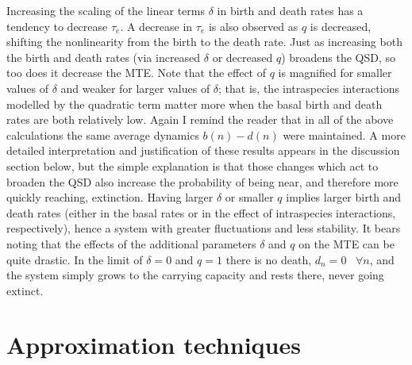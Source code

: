 Increasing the scaling of the linear terms $\delta$ in birth and death rates has a tendency to decrease $\tau_e$. 
A decrease in $\tau_e$ is also observed as $q$ is decreased, shifting the nonlinearity from the birth to the death rate. 
Just as increasing both the birth and death rates (via increased $\delta$ or decreased $q$) broadens the QSD, so too does it decrease the MTE. 
Note that the effect of $q$ is magnified for smaller values of $\delta$ and weaker for larger values of $\delta$; that is, the intraspecies interactions modelled by the quadratic term matter more when the basal birth and death rates are both relatively low. 
Again I remind the reader that in all of the above calculations the same average dynamics $b(n)-d(n)$ were maintained. 
A more detailed interpretation and justification of these results appears in the discussion section below, but the simple explanation is that those changes which act to broaden the QSD also increase the probability of being near, and therefore more quickly reaching, extinction. 
Having larger $\delta$ or smaller $q$ implies larger birth and death rates (either in the basal rates or in the effect of intraspecies interactions, respectively), hence a system with greater fluctuations and less stability. 
It bears noting that the effects of the additional parameters $\delta$ and $q$ on the MTE can be quite drastic. 
In the limit of $\delta=0$ and $q=1$ there is no death, $d_n=0 \,\text{ }\forall n$, and the system simply grows to the carrying capacity and rests there, never going extinct. 


\section{Approximation techniques}%


